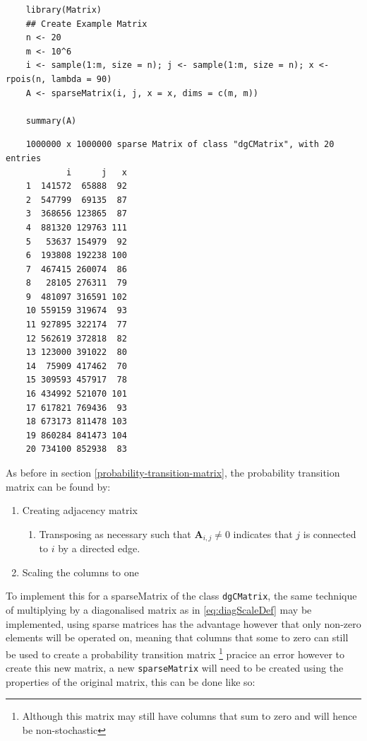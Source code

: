 \documentclass[11pt]{article}
\begin{document}
\begin{tcolorbox}
    \begin{verbatim}
    library(Matrix)
    ## Create Example Matrix
    n <- 20
    m <- 10^6
    i <- sample(1:m, size = n); j <- sample(1:m, size = n); x <- rpois(n, lambda = 90)
    A <- sparseMatrix(i, j, x = x, dims = c(m, m))

    summary(A)
    \end{verbatim}
\tcblower
    \begin{verbatim}
    1000000 x 1000000 sparse Matrix of class "dgCMatrix", with 20 entries
            i      j   x
    1  141572  65888  92
    2  547799  69135  87
    3  368656 123865  87
    4  881320 129763 111
    5   53637 154979  92
    6  193808 192238 100
    7  467415 260074  86
    8   28105 276311  79
    9  481097 316591 102
    10 559159 319674  93
    11 927895 322174  77
    12 562619 372818  82
    13 123000 391022  80
    14  75909 417462  70
    15 309593 457917  78
    16 434992 521070 101
    17 617821 769436  93
    18 673173 811478 103
    19 860284 841473 104
    20 734100 852938  83
    \end{verbatim}
\end{tcolorbox}

As before in section \ref{probability-transition-matrix}, the probability transition matrix can be found by:

\begin{enumerate}
\item Creating adjacency matrix
\begin{enumerate}
\item Transposing as necessary such that \(\mathbf{A}_{i,j}\neq 0\) indicates that \(j\) is connected to \(i\) by a directed edge.
\end{enumerate}
\item Scaling the columns to one
\end{enumerate}

To implement this for a sparseMatrix of the class \texttt{dgCMatrix}, the same
technique of multiplying by a diagonalised matrix as in \eqref{eq:diagScaleDef} may be
implemented, using sparse matrices has the advantage however that only non-zero
elements will be operated on, meaning that columns that some to zero can still
be used to create a probability transition matrix \footnote{Although this matrix may
still have columns that sum to zero and will hence be non-stochastic}
pracice an error however to create this new matrix, a new \texttt{sparseMatrix} will
need to be created using the properties of the original matrix, this can be done
like so:
\end{document}
